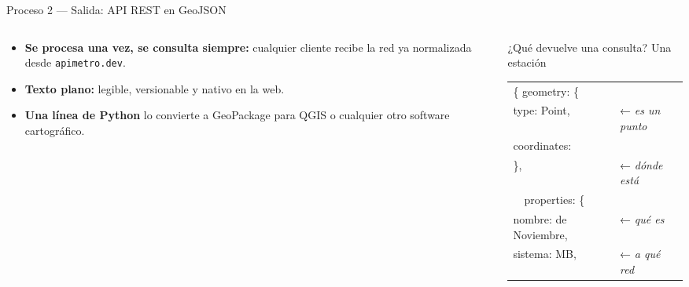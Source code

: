 \providecommand{\jq}[1]{\textquotedbl#1\textquotedbl}
\begin{frame}[t]{Proceso 2 — Salida: API REST en GeoJSON}
  \begin{columns}[T]
    \begin{column}{0.47\textwidth}
      \centering
      \resizebox{\linewidth}{!}{}

      \raggedright\scriptsize
      \vspace*{-0.2cm}
      \begin{itemize}\setlength{\itemsep}{0.05cm}
        \item \textbf{Se procesa una vez, se consulta siempre:} cualquier cliente
              recibe la red ya normalizada desde \texttt{apimetro.dev}.
        \item \textbf{Texto plano:} legible, versionable y nativo en la web.
        \item \textbf{Una línea de Python} lo convierte a GeoPackage para QGIS o cualquier otro software cartográfico.
      \end{itemize}
    \end{column}
    \begin{column}{0.51\textwidth}
      \begin{block}{\footnotesize ¿Qué devuelve una consulta? Una estación}
        \scriptsize
        \begin{tabular}{@{}l@{\enspace}l@{}}
          \ttfamily \{ \jq{geometry}: \{ & \\
          \ttfamily\quad \jq{type}: \jq{Point}, &
            {\color{SotmTerracota}← \itshape es un punto} \\
          \ttfamily\quad \jq{coordinates}: & \\
          \ttfamily\quad\quad [-99.134, 19.429] \}, &
            {\color{SotmTerracota}← \itshape dónde está} \\
          \ttfamily\ \ \jq{properties}: \{ & \\
          \ttfamily\quad \jq{nombre}: \jq{20 de Noviembre}, &
            {\color{SotmTerracota}← \itshape qué es} \\
          \ttfamily\quad \jq{sistema}: \jq{MB}, &
            {\color{SotmTerracota}← \itshape a qué red} \\

\end{tabular}
\end{block}
\end{column}
\end{columns}
\end{frame}
